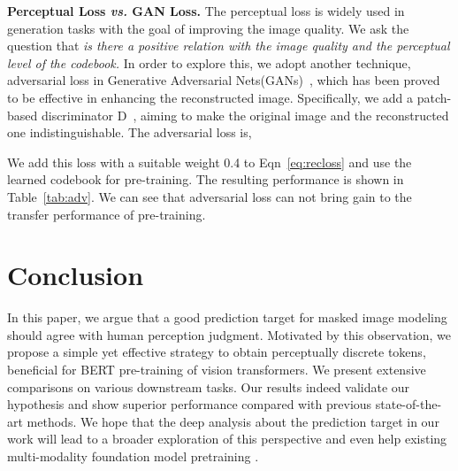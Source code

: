 \documentclass[letterpaper]{article} \usepackage{aaai23}  \usepackage{times}  \usepackage{helvet}  \usepackage{courier}  \usepackage[hyphens]{url}  \usepackage{graphicx} \urlstyle{rm} \def\UrlFont{\rm}  \usepackage{natbib}  \usepackage{caption} \frenchspacing  \setlength{\pdfpagewidth}{8.5in}  \setlength{\pdfpageheight}{11in}  \usepackage{algorithm}
\begin{document}
\begin{table}[t]
\centering
\small


\caption{Performance comparison when using different loss functions. Adding an extra adversarial loss can not bring gain to the transfer performance.}
\label{tab:adv}
\end{table}

\noindent \textbf{Perceptual Loss \emph{vs.} GAN Loss.} 
The perceptual loss is widely used in generation tasks with the goal of improving
the image quality. We ask the question that
\emph{is there a positive relation with the image quality and the perceptual level of the codebook.}
In order to explore this, we adopt another technique, adversarial loss in Generative Adversarial Nets(GANs)~\cite{goodfellow2014generative}, which has been proved to be effective in enhancing the reconstructed image.
Specifically, 
we add a patch-based discriminator D~\cite{li2016precomputed}, aiming to make the original image and the reconstructed one indistinguishable.
The adversarial loss is,

We add this loss with a suitable weight 0.4 to Eqn~\ref{eq:recloss}  and use the learned codebook for pre-training.
The resulting performance is shown in Table~\ref{tab:adv}.
We can see that adversarial loss can not bring gain to the transfer performance of pre-training.




\section{Conclusion}

In this paper, we argue that a good prediction target for masked image modeling should agree with human perception judgment.
Motivated by this observation, we propose a simple yet effective strategy to obtain perceptually discrete tokens, beneficial for BERT pre-training of vision transformers.
We present extensive comparisons on various downstream tasks. Our results indeed validate our hypothesis and show superior performance compared with previous state-of-the-art methods. We hope that the deep analysis about the prediction target in our work will lead to a broader exploration of this perspective and even help existing multi-modality foundation model pretraining \cite{yuan2021florence,wang2022omnivl}. 
\end{document}
